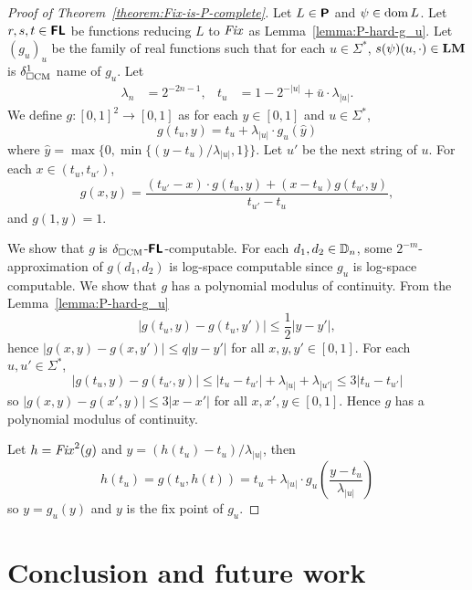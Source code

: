 \documentclass[envcountsame,orivec,oribibl]{llncs}
\begin{document}
\begin{proof}
[Proof of Theorem~\ref{theorem:Fix-is-P-complete}]
Let $L \in \text{\bfseries \sffamily \upshape P}$ and $\psi \in \mathop{\rm dom} L$.
Let $r, s, t \in \text{\bfseries \sffamily \upshape FL}$ be functions reducing $L$ to $\mathit{Fix}$
as Lemma~\ref{lemma:P-hard-g_u}.
Let $(g_u)_u$ be the family of real functions such that for each $u \in \Sigma^*$, 
$s(\psi)(u, \cdot) \in \mathbf{LM}$ is $\delta _{\square \mathrm{CM}}^1$ name of $g_u$.
Let
\begin{align}
 \lambda_n &= 2^{-2n-1},
 &
 t_u & = 1 - 2^{-|u|} + \bar u \cdot \lambda_{|u|}.
\end{align}
We define $g \colon [0,1]^2 \to [0,1]$ as
for each $y \in [0,1]$ and $u \in \Sigma^*$,
\begin{equation}
 g(t_u, y) = t_u + \lambda_{|u|} \cdot g_u(\hat y)
\end{equation}
where $\hat y = \max\{0, \min\{(y-t_u)/\lambda_{|u|}, 1\}\}$.
Let $u'$ be the next string of $u$.
For each $x \in (t_u, t_{u'})$,
\begin{equation}
 g(x, y) 
  = \frac{(t_{u'} - x) \cdot g(t_u, y) + (x - t_u)g(t_{u'}, y)}{t_{u'} - t_u},
\end{equation}
and $g(1, y) = 1$.

We show that $g$ is $\delta _{\square \mathrm{CM}}$-$\text{\bfseries \sffamily \upshape FL}$-computable.
For each $d_1, d_2 \in \mathbb D_n$, some $2^{-m}$-approximation of $g(d_1, d_2)$ 
is log-space computable since $g_u$ is log-space computable.
We show that $g$ has a polynomial modulus of continuity.
From the Lemma~\ref{lemma:P-hard-g_u}
\begin{equation}
 |g(t_u, y) - g(t_u, y')| \le \frac 1 2 |y - y'|,
\end{equation}
hence $|g(x, y) - g(x, y')| \le q|y - y'|$ for all $x, y, y' \in [0,1]$.
For each $u, u' \in \Sigma^*$,
\begin{equation}
 |g(t_u, y) - g(t_{u'}, y)| \le |t_u - t_{u'}| + \lambda_{|u|} + \lambda_{|u'|} \le 3|t_u - t_{u'}|
\end{equation}
so $|g(x, y) - g(x', y)| \le 3|x-x'|$ for all $x, x', y \in [0,1]$.
Hence $g$ has a polynomial modulus of continuity.


Let $h = \mathit{Fix}^2(g)$ and $y = (h(t_u)-t_u)/\lambda_{|u|}$, then
\begin{equation}
 h(t_u) = g(t_u, h(t)) = t_u + \lambda_{|u|} \cdot g_u \left( \frac{y-t_u}{\lambda_{|u|}} \right)
\end{equation}
so $y = g_u(y)$ and $y$ is the fix point of $g_u$.
\end{proof}


\section{Conclusion and future work}
\label{chapter:conclusion}
\end{document}
